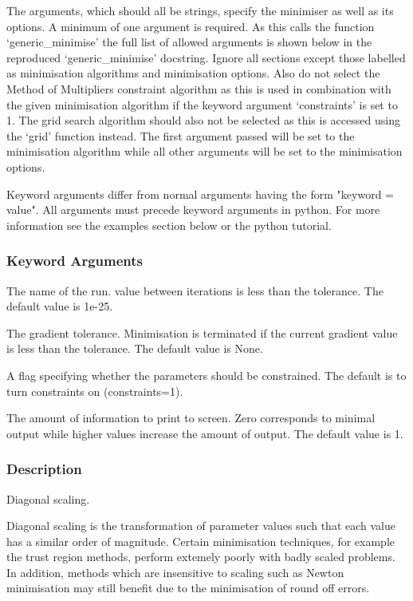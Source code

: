 The arguments, which should all be strings, specify the minimiser as well as its options.  A
minimum of one argument is required.  As this calls the function `generic\_minimise' the full
list of allowed arguments is shown below in the reproduced `generic\_minimise' docstring.
Ignore all sections except those labelled as minimisation algorithms and minimisation
options.  Also do not select the Method of Multipliers constraint algorithm as this is used
in combination with the given minimisation algorithm if the keyword argument `constraints'
is set to 1.  The grid search algorithm should also not be selected as this is accessed
using the `grid' function instead.  The first argument passed will be set to the
minimisation algorithm while all other arguments will be set to the minimisation options.

Keyword arguments differ from normal arguments having the form "keyword = value".  All
arguments must precede keyword arguments in python.  For more information see the examples
section below or the python tutorial.


\subsubsection{Keyword Arguments}

  The name of the run.
value between iterations is less than the tolerance.  The default value is 1e-25.

  The gradient tolerance.  Minimisation is terminated if the current gradient value is less than the tolerance.  The default value is None.

  A flag specifying whether the parameters should be constrained.  The default is to turn constraints on (constraints=1).


  The amount of information to print to screen.  Zero corresponds to minimal output while higher values increase the amount of output.  The default value is 1.

\subsubsection{Description}

Diagonal scaling.

Diagonal scaling is the transformation of parameter values such that each value has a
similar order of magnitude.  Certain minimisation techniques, for example the trust region
methods, perform extemely poorly with badly scaled problems.  In addition, methods which are
insensitive to scaling such as Newton minimisation may still benefit due to the minimisation
of round off errors.

